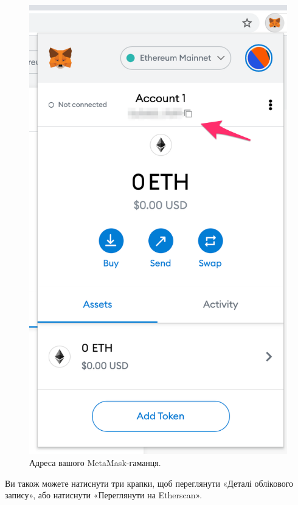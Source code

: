 \begin{enumerate}
    \begin{figure}[ht]
            \centering
            \includegraphics[scale=0.4]{IMAGES/metamask10.png}
            \caption{Адреса вашого MetaMask-гаманця.}
            \label{fig_pacman}
    \end{figure}
    
\newpage
Ви також можете натиснути три крапки, щоб переглянути «Деталі облікового запису», або натиснути «Переглянути на Etherscan».

\end{enumerate}

